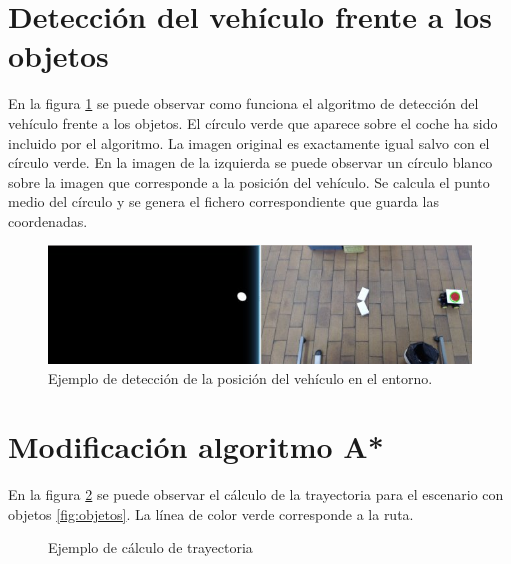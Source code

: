 \section{Detección del vehículo frente a los objetos}

En la figura \ref{fig:deteccionVehiculo1} se puede observar como funciona el algoritmo de detección del vehículo frente a los objetos. El círculo verde que aparece sobre el coche ha sido incluido por el algoritmo. La imagen original es exactamente igual salvo con el círculo verde. En la imagen de la izquierda se puede observar un círculo blanco sobre la imagen que corresponde a la posición del vehículo. Se calcula el punto medio del círculo y se genera el fichero correspondiente que guarda las coordenadas.

\begin{figure}[htbp]
 \centering
    \includegraphics[width=.95\textwidth]{./figures/deteccionvehiculo2.jpeg}
 \caption{Ejemplo de detección de la posición del vehículo en el entorno.}
 \label{fig:deteccionVehiculo1}
\end{figure}

\section{Modificación algoritmo A* \cite{ImplementacionAlgoritmoA}}

En la figura \ref{fig:ResultadoAEstrella} se puede observar el cálculo de la trayectoria para el escenario con objetos \ref{fig:objetos}. La línea de color verde corresponde a la ruta.

\begin{figure}[htbp]
 \centering
 \caption{Ejemplo de cálculo de trayectoria}
 \label{fig:ResultadoAEstrella}
\end{figure}

